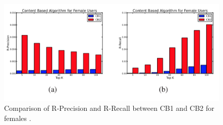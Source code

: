 \documentclass[11pt]{article}
\begin{document}
\begin{figure}[h]
\begin{center}
\includegraphics{r_female.png} 
\caption{Comparison of R-Precision and R-Recall between CB1 and CB2 for females \cite{recip}.} 
\end{center}
\end{figure}

\pagebreak
\nocite{*}


\end{document}
